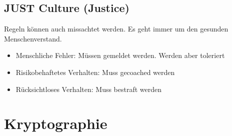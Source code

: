 \subsection{JUST Culture (Justice) }
Regeln können auch missachtet werden. Es geht immer um den gesunden Menschenverstand.
\begin{itemize}
	\item Menschliche Fehler: Müssen gemeldet werden. Werden aber toleriert
	\item Risikobehaftetes Verhalten: Muss gecoached werden
	\item Rücksichtloses Verhalten: Muss bestraft werden
\end{itemize}

\section{Kryptographie}
